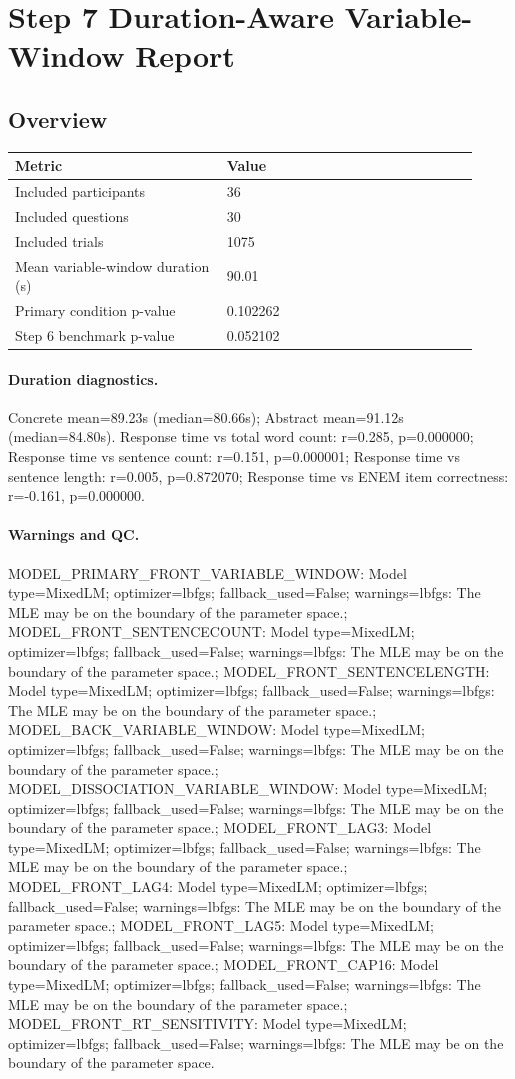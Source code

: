\documentclass[11pt]{article}
\begin{document}
\section*{Step 7 Duration-Aware Variable-Window Report}
\subsection*{Overview}
\begin{tabular}{p{0.42\linewidth}p{0.50\linewidth}}
\toprule
Metric & Value\\
\midrule
Included participants & 36\\
Included questions & 30\\
Included trials & 1075\\
Mean variable-window duration (s) & 90.01\\
Primary condition p-value & 0.102262\\
Step 6 benchmark p-value & 0.052102\\
\bottomrule
\end{tabular}
\paragraph{Duration diagnostics.} Concrete mean=89.23s (median=80.66s); Abstract mean=91.12s (median=84.80s). Response time vs total word count: r=0.285, p=0.000000; Response time vs sentence count: r=0.151, p=0.000001; Response time vs sentence length: r=0.005, p=0.872070; Response time vs ENEM item correctness: r=-0.161, p=0.000000.
\paragraph{Warnings and QC.} MODEL\_PRIMARY\_FRONT\_VARIABLE\_WINDOW: Model type=MixedLM; optimizer=lbfgs; fallback\_used=False; warnings=lbfgs: The MLE may be on the boundary of the parameter space.; MODEL\_FRONT\_SENTENCECOUNT: Model type=MixedLM; optimizer=lbfgs; fallback\_used=False; warnings=lbfgs: The MLE may be on the boundary of the parameter space.; MODEL\_FRONT\_SENTENCELENGTH: Model type=MixedLM; optimizer=lbfgs; fallback\_used=False; warnings=lbfgs: The MLE may be on the boundary of the parameter space.; MODEL\_BACK\_VARIABLE\_WINDOW: Model type=MixedLM; optimizer=lbfgs; fallback\_used=False; warnings=lbfgs: The MLE may be on the boundary of the parameter space.; MODEL\_DISSOCIATION\_VARIABLE\_WINDOW: Model type=MixedLM; optimizer=lbfgs; fallback\_used=False; warnings=lbfgs: The MLE may be on the boundary of the parameter space.; MODEL\_FRONT\_LAG3: Model type=MixedLM; optimizer=lbfgs; fallback\_used=False; warnings=lbfgs: The MLE may be on the boundary of the parameter space.; MODEL\_FRONT\_LAG4: Model type=MixedLM; optimizer=lbfgs; fallback\_used=False; warnings=lbfgs: The MLE may be on the boundary of the parameter space.; MODEL\_FRONT\_LAG5: Model type=MixedLM; optimizer=lbfgs; fallback\_used=False; warnings=lbfgs: The MLE may be on the boundary of the parameter space.; MODEL\_FRONT\_CAP16: Model type=MixedLM; optimizer=lbfgs; fallback\_used=False; warnings=lbfgs: The MLE may be on the boundary of the parameter space.; MODEL\_FRONT\_RT\_SENSITIVITY: Model type=MixedLM; optimizer=lbfgs; fallback\_used=False; warnings=lbfgs: The MLE may be on the boundary of the parameter space.
\end{document}
